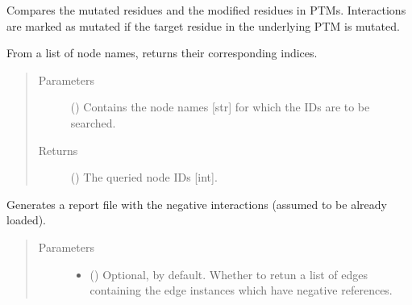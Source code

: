 \documentclass[letterpaper,10pt,english]{sphinxmanual}
\begin{document}
\begin{fulllineitems}

\begin{fulllineitems}
\label{\detokenize{main:pypath.main.PyPath.mutated_edges}}
Compares the mutated residues and the modified residues in PTMs.
Interactions are marked as mutated if the target residue in the
underlying PTM is mutated.

\end{fulllineitems}


\begin{fulllineitems}
\label{\detokenize{main:pypath.main.PyPath.names2vids}}
From a list of node names, returns their corresponding indices.
\begin{quote}\begin{description}
\item[{Parameters}] \leavevmode
{} () \textendash{} Contains the node names {[}str{]} for which the IDs are to be
searched.

\item[{Returns}] \leavevmode
() \textendash{} The queried node IDs {[}int{]}.

\end{description}\end{quote}

\end{fulllineitems}


\begin{fulllineitems}
\label{\detokenize{main:pypath.main.PyPath.negative_report}}
Generates a report file with the negative interactions (assumed
to be already loaded).
\begin{quote}\begin{description}
\item[{Parameters}] \leavevmode\begin{itemize}
\item {} 
 () \textendash{} Optional,  by default. Whether to retun a list of
edges containing the edge instances which have negative
references.


\end{itemize}
\end{description}
\end{quote}
\end{fulllineitems}
\end{fulllineitems}
\end{document}
